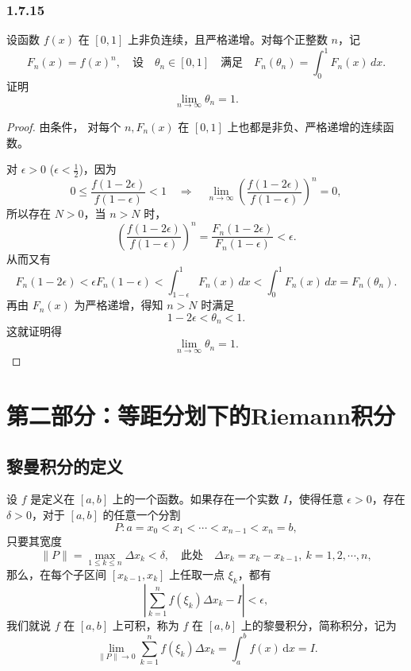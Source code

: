 \documentclass[12pt]{ctexart}
\begin{document}
\subsubsection*{1.7.15}

设函数 $f(x)$ 在 $[0,1]$ 上非负连续，且严格递增。对每个正整数 $n$，记
\[
F_n(x) = f(x)^n, \quad \text{设} \quad \theta_n \in [0,1] \quad \text{满足} \quad F_n(\theta_n) = \int_0^1 F_n(x) \, dx.
\]
证明
\[
\lim_{n \to \infty} \theta_n = 1.
\]

\begin{proof}
    由条件， 对每个 $n, F_n(x)$ 在 $[0,1]$ 上也都是非负、严格递增的连续函数。

    对 $\epsilon > 0$ ($\epsilon < \frac{1}{2}$)，因为
    \[
    0 \leq \frac{f(1 - 2\epsilon)}{f(1 - \epsilon)} < 1 \quad \Rightarrow \quad \lim_{n \to \infty} \left( \frac{f(1 - 2\epsilon)}{f(1 - \epsilon)} \right)^n = 0,
    \]
    所以存在 $N > 0$，当 $n > N$ 时，
    \[
    \left( \frac{f(1 - 2\epsilon)}{f(1 - \epsilon)} \right)^n = \frac{F_n(1 - 2\epsilon)}{F_n(1 - \epsilon)} < \epsilon.
    \]
    从而又有
    \[
    F_n(1 - 2\epsilon) < \epsilon F_n(1 - \epsilon) < \int_{1 - \epsilon}^1 F_n(x) \, dx < \int_0^1 F_n(x) \, dx = F_n(\theta_n).
    \]
    再由 $F_n(x)$ 为严格递增，得知 $n > N$ 时满足
    \[
    1 - 2\epsilon < \theta_n < 1.
    \]
    这就证明得
    \[
    \lim_{n \to \infty} \theta_n = 1.
    \]
\end{proof}

\newpage
\section{第二部分：等距分划下的Riemann积分}

\subsection{黎曼积分的定义}
设 $f$ 是定义在 $[a,b]$ 上的一个函数。如果存在一个实数 $I$，使得任意 $\epsilon > 0$，存在 $\delta > 0$，对于 $[a,b]$ 的任意一个分割
\[
P : a = x_0 < x_1 < \cdots < x_{n-1} < x_n = b,
\]
只要其宽度
\[
\|P\| = \max_{1 \leq k \leq n} \Delta x_k < \delta, \quad \text{此处} \quad \Delta x_k = x_k - x_{k-1}, \ k = 1,2,\cdots,n,
\]
那么，在每个子区间 $[x_{k-1},x_k]$ 上任取一点 $\xi_k$，都有
\[
\left| \sum_{k=1}^n f(\xi_k)\Delta x_k - I \right| < \epsilon,
\]
我们就说 $f$ 在 $[a,b]$ 上可积，称为 $f$ 在 $[a,b]$ 上的黎曼积分，简称积分，记为
\[
\lim_{\|P\| \to 0} \sum_{k=1}^n f(\xi_k)\Delta x_k = \int_a^b f(x)\, \mathrm{d}x = I.
\]
\end{document}
